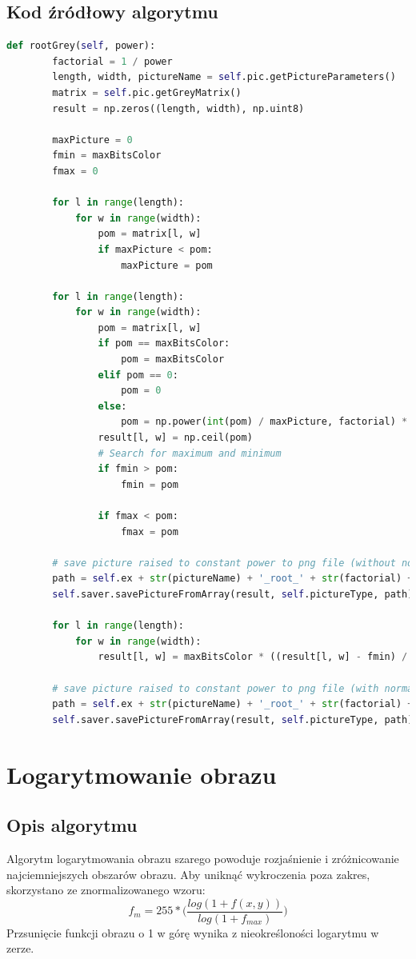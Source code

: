 \documentclass[a4paper,12pt, titlepage]{report}
\begin{document}
\subsection*{Kod źródłowy algorytmu}
\begin{lstlisting}[language=Python]
def rootGrey(self, power):
        factorial = 1 / power
        length, width, pictureName = self.pic.getPictureParameters()
        matrix = self.pic.getGreyMatrix()
        result = np.zeros((length, width), np.uint8)

        maxPicture = 0
        fmin = maxBitsColor
        fmax = 0

        for l in range(length):
            for w in range(width):
                pom = matrix[l, w]
                if maxPicture < pom:
                    maxPicture = pom

        for l in range(length):
            for w in range(width):
                pom = matrix[l, w]
                if pom == maxBitsColor:
                    pom = maxBitsColor
                elif pom == 0:
                    pom = 0
                else:
                    pom = np.power(int(pom) / maxPicture, factorial) * maxBitsColor
                result[l, w] = np.ceil(pom)
                # Search for maximum and minimum
                if fmin > pom:
                    fmin = pom

                if fmax < pom:
                    fmax = pom

        # save picture raised to constant power to png file (without normalization)
        path = self.ex + str(pictureName) + '_root_' + str(factorial) + '.png'
        self.saver.savePictureFromArray(result, self.pictureType, path)

        for l in range(length):
            for w in range(width):
                result[l, w] = maxBitsColor * ((result[l, w] - fmin) / (fmax - fmin))

        # save picture raised to constant power to png file (with normalization)
        path = self.ex + str(pictureName) + '_root_' + str(factorial) + '_normalized.png'
        self.saver.savePictureFromArray(result, self.pictureType, path)
\end{lstlisting}

\section{Logarytmowanie obrazu}
\subsection*{Opis algorytmu}
\par Algorytm logarytmowania obrazu szarego powoduje rozjaśnienie i zróżnicowanie najciemniejszych obszarów obrazu. Aby uniknąć wykroczenia poza zakres, skorzystano ze znormalizowanego wzoru: \[f_{m}=255*\Big(\frac{log(1+f(x,y))}{log(1+f_{max})}\Big)\]Przsunięcie funkcji obrazu o 1 w górę wynika z nieokreśloności logarytmu w zerze.
\end{document}
